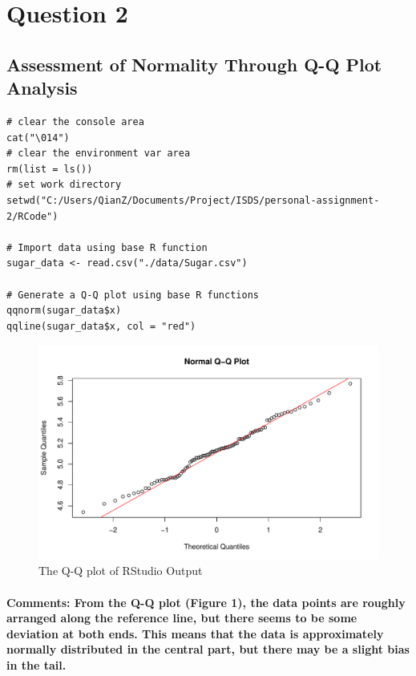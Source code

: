 \section{Question 2}
% 
\subsection{Assessment of Normality Through Q-Q Plot Analysis}
% 
\begin{lstlisting}[style=rstyle]
# clear the console area
cat("\014")
# clear the environment var area
rm(list = ls())
# set work directory
setwd("C:/Users/QianZ/Documents/Project/ISDS/personal-assignment-2/RCode")

# Import data using base R function
sugar_data <- read.csv("./data/Sugar.csv")

# Generate a Q-Q plot using base R functions
qqnorm(sugar_data$x)
qqline(sugar_data$x, col = "red")

\end{lstlisting}
% 
% 
% 
% 
% 
% 
\begin{figure}[H]
    \centering
    \includegraphics[width=\textwidth]{img/Q2_q1.pdf}
    \caption{The Q-Q plot of RStudio Output}
\end{figure}
% 
% 
% 
% 
% 
% 
\paragraph{\textbf{Comments:} From the Q-Q plot (Figure 1), the data points are roughly arranged along the reference line, but there seems to be some deviation at both ends. This means that the data is approximately normally distributed in the central part, but there may be a slight bias in the tail.}
% 
% 
% 
% 
% 
% 
% 
% 
% 
